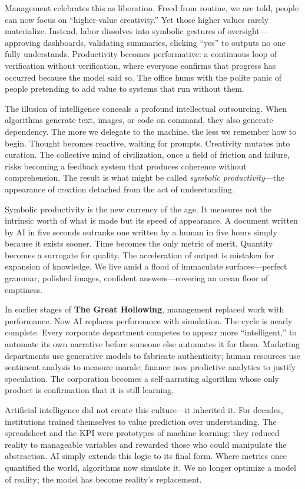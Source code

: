 \documentclass[11pt,twoside]{book}
\begin{document}
Management celebrates this as liberation.  Freed from routine, we are told, people can now focus on “higher-value creativity.”  Yet those higher values rarely materialize.  Instead, labor dissolves into symbolic gestures of oversight—approving dashboards, validating summaries, clicking “yes” to outputs no one fully understands.  Productivity becomes performative: a continuous loop of verification without verification, where everyone confirms that progress has occurred because the model said so.  The office hums with the polite panic of people pretending to add value to systems that run without them.

The illusion of intelligence conceals a profound intellectual outsourcing.  When algorithms generate text, images, or code on command, they also generate dependency.  The more we delegate to the machine, the less we remember how to begin.  Thought becomes reactive, waiting for prompts.  Creativity mutates into curation.  The collective mind of civilization, once a field of friction and failure, risks becoming a feedback system that produces coherence without comprehension.  The result is what might be called \emph{symbolic productivity}—the appearance of creation detached from the act of understanding.

Symbolic productivity is the new currency of the age.  It measures not the intrinsic worth of what is made but its speed of appearance.  A document written by AI in five seconds outranks one written by a human in five hours simply because it exists sooner.  Time becomes the only metric of merit.  Quantity becomes a surrogate for quality.  The acceleration of output is mistaken for expansion of knowledge.  We live amid a flood of immaculate surfaces—perfect grammar, polished images, confident answers—covering an ocean floor of emptiness.

In earlier stages of \textbf{The Great Hollowing}, management replaced work with performance.  Now AI replaces performance with simulation.  The cycle is nearly complete.  Every corporate department competes to appear more “intelligent,” to automate its own narrative before someone else automates it for them.  Marketing departments use generative models to fabricate authenticity; human resources use sentiment analysis to measure morale; finance uses predictive analytics to justify speculation.  The corporation becomes a self-narrating algorithm whose only product is confirmation that it is still learning.

Artificial intelligence did not create this culture—it inherited it.  For decades, institutions trained themselves to value prediction over understanding.  The spreadsheet and the KPI were prototypes of machine learning: they reduced reality to manageable variables and rewarded those who could manipulate the abstraction.  AI simply extends this logic to its final form.  Where metrics once quantified the world, algorithms now simulate it.  We no longer optimize a model of reality; the model has become reality’s replacement.
\end{document}

